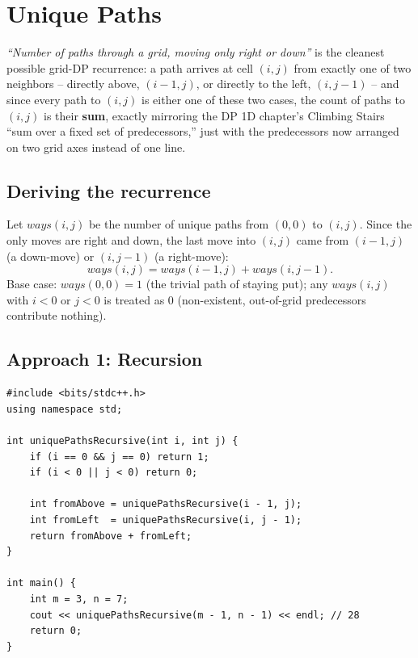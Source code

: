 \section{Unique Paths}
\label{sec:dp-unique-paths}


\begin{patternbox}
\emph{``Number of paths through a grid, moving only right or down''} is
the cleanest possible grid-DP recurrence: a path arrives at cell
$(i,j)$ from exactly one of two neighbors -- directly above, $(i-1,j)$,
or directly to the left, $(i,j-1)$ -- and since every path to $(i,j)$ is
either one of these two cases, the count of paths to $(i,j)$ is their
\textbf{sum}, exactly mirroring the DP 1D chapter's Climbing Stairs
``sum over a fixed set of predecessors,'' just with the predecessors now
arranged on two grid axes instead of one line.
\end{patternbox}

\subsection*{Deriving the recurrence}

Let $\textit{ways}(i,j)$ be the number of unique paths from $(0,0)$ to
$(i,j)$. Since the only moves are right and down, the last move into
$(i,j)$ came from $(i-1,j)$ (a down-move) or $(i,j-1)$ (a right-move):
\[
  \textit{ways}(i,j) = \textit{ways}(i-1,j) + \textit{ways}(i,j-1).
\]
Base case: $\textit{ways}(0,0) = 1$ (the trivial path of staying put);
any $\textit{ways}(i,j)$ with $i<0$ or $j<0$ is treated as $0$
(non-existent, out-of-grid predecessors contribute nothing).

\subsection*{Approach 1: Recursion}

\begin{lstlisting}
#include <bits/stdc++.h>
using namespace std;

int uniquePathsRecursive(int i, int j) {
    if (i == 0 && j == 0) return 1;
    if (i < 0 || j < 0) return 0;

    int fromAbove = uniquePathsRecursive(i - 1, j);
    int fromLeft  = uniquePathsRecursive(i, j - 1);
    return fromAbove + fromLeft;
}

int main() {
    int m = 3, n = 7;
    cout << uniquePathsRecursive(m - 1, n - 1) << endl; // 28
    return 0;
}
\end{lstlisting}


